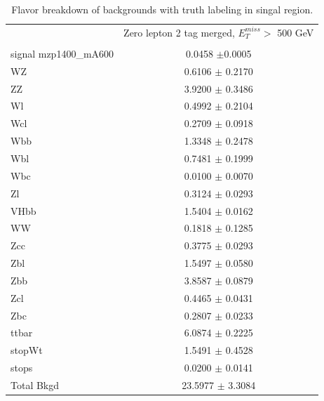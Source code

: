 \begin{table}
    \centering
    \tiny
    \begin{tabular}{l|c|}
    \cline{2-2}
     & \multicolumn{1}{c|}{Zero lepton 2 tag merged,  $E_{T}^{miss}$$ >$ 500 GeV}\\
    \\ \hline
    

        signal mzp1400\_mA600  & 0.0458        $\pm$0.0005       \\ \hline
        WZ    &0.6106        $\pm$ 0.2170      \\ 
        ZZ    &3.9200        $\pm$ 0.3486      \\ 
        Wl    &0.4992        $\pm$ 0.2104      \\ 
        Wcl   & 0.2709        $\pm$ 0.0918     \\ 
        Wbb   & 1.3348        $\pm$ 0.2478     \\ 
        Wbl   & 0.7481        $\pm$ 0.1999     \\ 
        Wbc   & 0.0100        $\pm$ 0.0070     \\ 
        Zl    &0.3124        $\pm$ 0.0293      \\ 
        VHbb  &  1.5404        $\pm$ 0.0162    \\ 
        WW    &0.1818        $\pm$ 0.1285      \\ 
        Zcc   & 0.3775        $\pm$ 0.0293     \\ 
        Zbl   & 1.5497        $\pm$ 0.0580     \\ 
        Zbb   & 3.8587        $\pm$ 0.0879     \\                                                                                                                                                                                                                                                                    
        Zcl   & 0.4465        $\pm$ 0.0431     \\ 
        Zbc   & 0.2807        $\pm$ 0.0233     \\ 
        ttbar &   6.0874        $\pm$ 0.2225   \\ 
        stopWt&    1.5491        $\pm$ 0.4528  \\ 
        stops &   0.0200        $\pm$ 0.0141   \\ 
        \hline
        Total Bkgd &  23.5977    $\pm$ 3.3084           \\    
        \hline

    \end{tabular}
    \caption{Flavor breakdown of backgrounds with truth labeling in singal region.}
    \label{tab:fl0}



\end{table}


